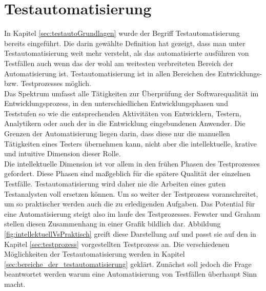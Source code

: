 \chapter{Testautomatisierung}
\label{sec:testautomatisierung}
In Kapitel \ref{sec:testautoGrundlagen} wurde der Begriff Testautomatisierung bereits eingeführt. Die darin gewählte Definition hat gezeigt, dass man unter Testautomatisierung weit mehr versteht, als das automatisierte ausführen von Testfällen auch wenn das der wohl am weitesten verbreiteten Bereich der Automatisierung ist.
Testautomatisierung ist in allen Bereichen des Entwicklungs- bzw. Testprozesses möglich.\\
\glqq Das Spektrum umfasst alle Tätigkeiten zur Überprüfung der Softwarequalität im Entwicklungsprozess, in den unterschiedlichen Entwicklungsphasen und Teststufen so wie die entsprechenden Aktivitäten von Entwicklern, Testern, Analytikern oder auch der in die Entwicklung eingebundenen Anwender. Die Grenzen der Automatisierung liegen darin, dass diese nur die manuellen Tätigkeiten eines Testers übernehmen kann, nicht aber die intellektuelle, krative und intuitive Dimension dieser Rolle.\grqq\ \cite[S.7]{seidl_basiswissen_2012} \\
Die intellektuelle Dimension ist vor allem in den frühen Phasen des Testprozesses gefordert. Diese Phasen sind maßgeblich für die spätere Qualität der einzelnen Testfälle. Testautomatisierung wird daher nie die Arbeiten eines guten Testanalysten voll ersetzen können. Um so weiter der Testprozess voranschreitet, um so praktischer werden auch die zu erledigenden Aufgaben. Das Potential für eine Automatisierung steigt also im laufe des Testprozesses.
Fewster und Graham \cite[vgl. S.18]{fewster_software_1999} stellen diesen Zusammenhang in einer Grafik bildlich dar.  Abbildung \ref{fig:intellektuellVsPraktisch} greift diese Darstellung auf und passt sie auf den in Kapitel \ref{sec:testprozess} vorgestellten Testprozess an. Die verschiedenen Möglichkeiten der Testautomatisierung werden in Kapitel \ref{sec:bereiche_der_testautomatisierung} geklärt. Zunächst soll jedoch die Frage beantwortet werden warum eine Automatisierung von Testfällen überhaupt Sinn macht.

